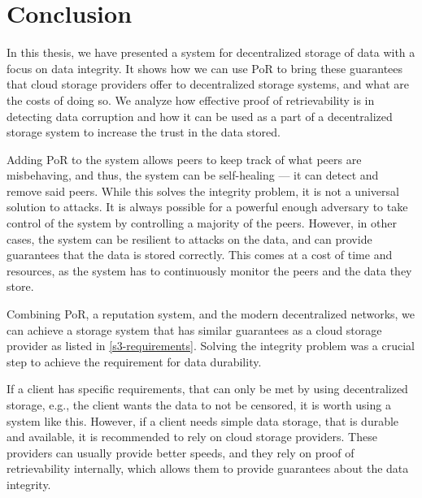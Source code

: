\chapter{Conclusion}
\label{chapter:conclusion}

In this thesis, we have presented a system for decentralized storage of data
with a focus on data integrity.
It shows how we can use PoR to bring these guarantees that cloud storage providers
offer to decentralized storage systems, and what are the costs of doing so.
We analyze how effective proof of retrievability is in detecting data corruption
and how it can be used as a part of a decentralized storage system
to increase the trust in the data stored.

Adding PoR to the system allows peers to keep track of what peers are misbehaving,
and thus, the system can be self-healing --- it can detect and remove said peers.
While this solves the integrity problem, it is not a universal solution to attacks.
It is always possible for a powerful enough adversary to take control of the system
by controlling a majority of the peers.
However, in other cases, the system can be resilient to attacks on the data,
and can provide guarantees that the data is stored correctly.
This comes at a cost of time and resources, as the system has to continuously
monitor the peers and the data they store.

Combining PoR, a reputation system, and the modern decentralized networks,
we can achieve a storage system that has similar guarantees as a cloud storage provider
as listed in \autoref{s3-requirements}.
Solving the integrity problem was a crucial step to achieve the requirement for data durability.

If a client has specific requirements, that can only be met by using decentralized storage,
e.g., the client wants the data to not be censored, it is worth using a system like this.
However, if a client needs simple data storage, that is durable and available,
it is recommended to rely on cloud storage providers.
These providers can usually provide better speeds, and they rely on proof of retrievability internally,
which allows them to provide guarantees about the data integrity.
